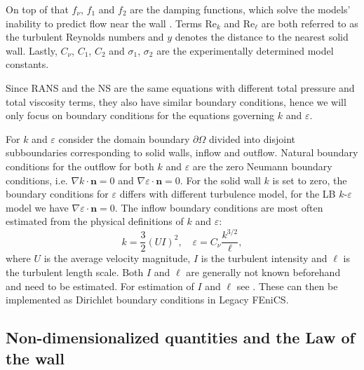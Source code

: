 On top of that \(f_\nu\), \(f_1\) and \(f_2\) are the damping functions, which solve the models' inability to predict flow near the wall \citep{greenshields_notes_2022}. Terms \(\text{Re}_k\) and \(\text{Re}_\ell\) are both referred to as the turbulent Reynolds numbers and \(y\) denotes the distance to the nearest solid wall. Lastly, \(C_\nu\), \(C_1\), \(C_2\) and \(\sigma_1\), \(\sigma_2\) are the experimentally determined model constants.

Since RANS and the NS are the same equations with different total pressure and total viscosity terms, they also have similar boundary conditions, hence we will only focus on boundary conditions for the equations governing \(k\) and \(\varepsilon\).

For \(k\) and \(\varepsilon\) consider the domain boundary \(\partial \Omega\) divided into disjoint subboundaries corresponding to solid walls, inflow and outflow. Natural boundary conditions for the outflow for both \(k\) and \(\varepsilon\) are the zero Neumann boundary conditions, i.e. \(\nabla k \cdot \mathbf{n} = 0\) and \(\nabla \varepsilon \cdot \mathbf{n} = 0\). For the solid wall \(k\) is set to zero, the boundary conditions for \(\varepsilon\) differs with different turbulence model, for the LB \(k\)-\(\varepsilon\) model we have \(\nabla \varepsilon \cdot \mathbf{n} = 0\). The inflow boundary conditions are most often estimated from the physical definitions of \(k\) and \(\varepsilon\):
\begin{equation*}\label{eq: definitions of k-e}
    k = \frac{3}{2} (U I)^2, 
    \quad
    \varepsilon = C_\nu \frac{k^{3/2}}{\ell},
\end{equation*}
where \(U\) is the average velocity magnitude, \(I\) is the turbulent intensity and \(\ell\) is the turbulent length scale. Both \(I\) and \(\ell\) are generally not known beforehand and need to be estimated. For estimation of \(I\) and \(\ell\) see \cite{greenshields_notes_2022}. These can then be implemented as Dirichlet boundary conditions in Legacy FEniCS.

\subsection{Non-dimensionalized quantities and the Law of the wall}

